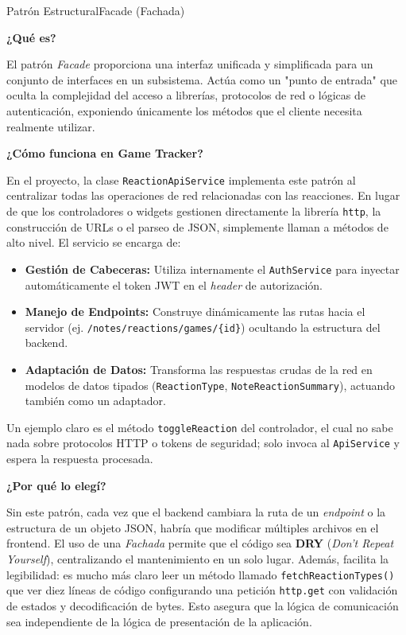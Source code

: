 \begin{patternbox}{Patrón Estructural}{Facade (Fachada)}

\textbf{¿Qué es?}

El patrón \textit{Facade} proporciona una interfaz unificada y simplificada para 
un conjunto de interfaces en un subsistema. Actúa como un "punto de entrada" 
que oculta la complejidad del acceso a librerías, protocolos de red o lógicas 
de autenticación, exponiendo únicamente los métodos que el cliente necesita 
realmente utilizar.

\vspace{0.5em}
\textbf{¿Cómo funciona en Game Tracker?}

En el proyecto, la clase \texttt{ReactionApiService} implementa este patrón al 
centralizar todas las operaciones de red relacionadas con las reacciones. En lugar 
de que los controladores o widgets gestionen directamente la librería \texttt{http}, 
la construcción de URLs o el parseo de JSON, simplemente llaman a métodos de alto 
nivel. El servicio se encarga de:

\begin{itemize}
    \item \textbf{Gestión de Cabeceras:} Utiliza internamente el \texttt{AuthService} 
    para inyectar automáticamente el token JWT en el \textit{header} de autorización.
    \item \textbf{Manejo de Endpoints:} Construye dinámicamente las rutas hacia 
    el servidor (ej. \texttt{/notes/reactions/games/\{id\}}) ocultando la estructura 
    del backend.
    \item \textbf{Adaptación de Datos:} Transforma las respuestas crudas de la red 
    en modelos de datos tipados (\texttt{ReactionType}, \texttt{NoteReactionSummary}), 
    actuando también como un adaptador.
\end{itemize}

Un ejemplo claro es el método \texttt{toggleReaction} del controlador, el cual no sabe 
nada sobre protocolos HTTP o tokens de seguridad; solo invoca al \texttt{ApiService} 
y espera la respuesta procesada.

\vspace{0.5em}
\textbf{¿Por qué lo elegí?}

Sin este patrón, cada vez que el backend cambiara la ruta de un \textit{endpoint} 
o la estructura de un objeto JSON, habría que modificar múltiples archivos en el 
frontend. El uso de una \textit{Fachada} permite que el código sea \textbf{DRY} 
(\textit{Don't Repeat Yourself}), centralizando el mantenimiento en un solo lugar. 
Además, facilita la legibilidad: es mucho más claro leer un método llamado 
\texttt{fetchReactionTypes()} que ver diez líneas de código configurando una 
petición \texttt{http.get} con validación de estados y decodificación de bytes. 
Esto asegura que la lógica de comunicación sea independiente de la lógica de 
presentación de la aplicación.


\end{patternbox}
